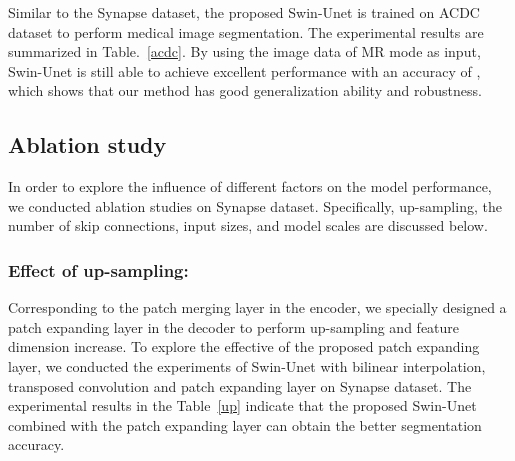 \documentclass[runningheads]{llncs}
\begin{document}
Similar to the Synapse dataset, the proposed Swin-Unet is trained on ACDC dataset to perform medical image segmentation. The experimental results are summarized in Table.~\ref{acdc}. By using the image data of MR mode as input, Swin-Unet is still able to achieve excellent performance with an accuracy of , which shows that our method has good generalization ability and robustness.

\subsection{Ablation study}

In order to explore the influence of different factors on the model performance, we conducted ablation studies on Synapse dataset. Specifically, up-sampling, the number of skip connections, input sizes, and model scales are discussed below.

\begin{table}[t!]
\caption{Ablation study on the impact of the up-sampling}\label{up}
\footnotesize
{}
\centering
\end{table}

\subsubsection{Effect of up-sampling:}
\label{upsampling}

Corresponding to the patch merging layer in the encoder, we specially designed a patch expanding layer in the decoder to perform up-sampling and feature dimension increase. To explore the effective of the proposed patch expanding layer, we conducted the experiments of Swin-Unet with bilinear interpolation, transposed convolution and patch expanding layer on Synapse dataset. The experimental results in the Table~\ref{up} indicate that the proposed Swin-Unet combined with the patch expanding layer can obtain the better segmentation accuracy.
\end{document}
